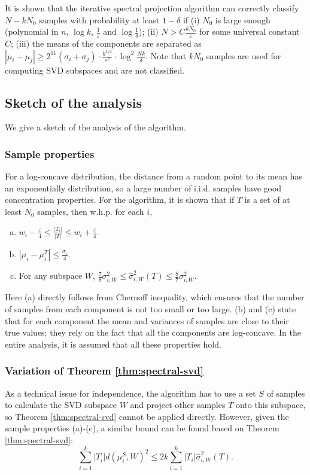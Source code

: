 \documentclass[11pt,letter]{article}
\begin{document}
It is shown that the iterative spectral projection algorithm can correctly classify $N-kN_0$ samples with probability at least $1-\delta$ if (i) $N_0$ is large enough (polynomial in $n$, $\log k$, $\frac1\varepsilon$ and $\log\frac1\delta$); (ii) $N>C\frac{kN_0}{\varepsilon}$ for some universal constant $C$; (iii) the means of the components are separated as $|\mu_i - \mu_j| \ge 2^{11} (\sigma_i+\sigma_j)\cdot \frac{k^{3/2}}{\varepsilon^2} \cdot \log^2\frac{Nk}{\delta}$. Note that $kN_0$ samples are used for computing SVD subspaces and are not classified.

\subsection{Sketch of the analysis}

We give a sketch of the analysis of the algorithm.

\subsubsection*{Sample properties}
For a log-concave distribution, the distance from a random point to its mean has an exponentially distribution, so a large number of i.i.d. samples have good concentration properties. For the algorithm, it is shown that if $T$ is a set of at least $N_0$ samples, then w.h.p. for each $i$,
\begin{enumerate}[(a)]
\item $w_i - \frac{\varepsilon}{4} \le \frac{|T_i|}{|T|} \le w_i + \frac{\varepsilon}{4}$.
\item $|\mu_i - \mu_i^T| \le \frac{\sigma_i}{4}$.
\item For any subspace $W$, $\frac78 \sigma_{i, W}^2 \le \hat \sigma_{i, W}^2(T) \le \frac87 \sigma_{i, W}^2$.
\end{enumerate}
Here (a) directly follows from Chernoff inequality, which ensures that the number of samples from each component is not too small or too large. (b) and (c) state that for each component the mean and variances of samples are close to their true values; they rely on the fact that all the components are log-concave.
In the entire analysis, it is assumed that all these properties hold.

\subsubsection*{Variation of Theorem \ref{thm:spectral-svd}}

As a technical issue for independence, the algorithm has to use a set $S$ of samples to calculate the SVD subspace $W$ and project other samples $T$ onto this subspace, so Theorem \ref{thm:spectral-svd} cannot be applied directly.
However, given the sample properties (a)-(c), a similar bound can be found based on Theorem \ref{thm:spectral-svd}:
\begin{equation} \label{eqn:thm1-variation}
\sum_{i=1}^k |T_i| d(\mu_i^S, W)^2 \le 2k \sum_{i=1}^k |T_i| \hat \sigma_{i, W}^2(T).
\end{equation}
\end{document}
